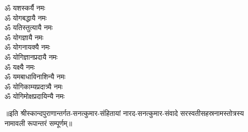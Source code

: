 \begin{flushleft}
\begin{multicols}{2}
ॐ यशस्कर्यै नमः\\
ॐ योगबद्धायै नमः\hfill{}\\
ॐ यतिस्तुत्यायै नमः\\
ॐ योगज्ञायै नमः\\
ॐ योगनायक्यै नमः\\
ॐ योगिज्ञानप्रदायै नमः\\
ॐ यक्ष्यै नमः\\
ॐ यमबाधाविनाशिन्यै नमः\\
ॐ योगिकाम्यप्रदात्र्यै नमः\\
ॐ योगिमोक्षप्रदायिन्यै नमः\\
\end{multicols}
\end{flushleft}
{॥इति श्रीस्कान्दपुराणान्तर्गत-सनत्कुमार-संहितायां नारद-सनत्कुमार-संवादे सरस्वतीसहस्रनामस्तोत्रस्य नामावली रूपान्तरं सम्पूर्णम्॥}
